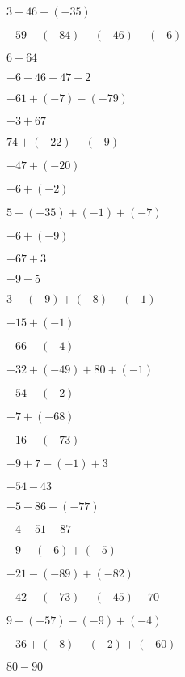{{\item$\num{3} + \num{46} + (\num{-35})$  \item$\num{-59} - (\num{-84}) - (\num{-46}) - (\num{-6})$  \item$\num{6} - \num{64}$

\item$\num{-6} - \num{46} - \num{47} + \num{2}$  \item$\num{-61} + (\num{-7}) - (\num{-79})$  \item$\num{-3} + \num{67}$

\item$\num{74} + (\num{-22}) - (\num{-9})$  \item$\num{-47} + (\num{-20})$  \item$\num{-6} + (\num{-2})$

\item$\num{5} - (\num{-35}) + (\num{-1}) + (\num{-7})$  \item$\num{-6} + (\num{-9})$  \item$\num{-67} + \num{3}$

\item$\num{-9} - \num{5}$  \item$\num{3} + (\num{-9}) + (\num{-8}) - (\num{-1})$  \item$\num{-15} + (\num{-1})$

\item$\num{-66} - (\num{-4})$  \item$\num{-32} + (\num{-49}) + \num{80} + (\num{-1})$  \item$\num{-54} - (\num{-2})$

\item$\num{-7} + (\num{-68})$  \item$\num{-16} - (\num{-73})$  \item$\num{-9} + \num{7} - (\num{-1}) + \num{3}$

\item$\num{-54} - \num{43}$  \item$\num{-5} - \num{86} - (\num{-77})$  \item$\num{-4} - \num{51} + \num{87}$

\item$\num{-9} - (\num{-6}) + (\num{-5})$  \item$\num{-21} - (\num{-89}) + (\num{-82})$  \item$\num{-42} - (\num{-73}) - (\num{-45}) - \num{70}$

\item$\num{9} + (\num{-57}) - (\num{-9}) + (\num{-4})$  \item$\num{-36} + (\num{-8}) - (\num{-2}) + (\num{-60})$  \item$\num{80} - \num{90}$

}}
